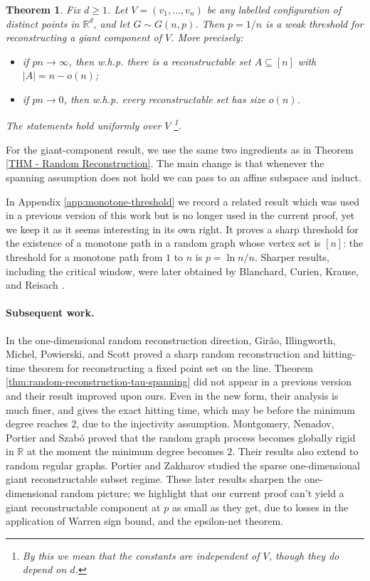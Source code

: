 \documentclass[fullpage,11pt]{article}
\theoremstyle{break}
\newtheorem{theorem}{Theorem}
\theoremstyle{definition}
\theoremstyle{break}
\begin{document}
\begin{theorem}\label{thm:weak-threshold-linear-reconstruction}
Fix \(d\ge1\). Let \(V=(v_1,\ldots,v_n)\) be any labelled configuration of
distinct points in \(\mathbb R^d\), and let \(G\sim G(n,p)\). Then \(p=1/n\)
is a weak threshold for reconstructing a giant component of \(V\). More
precisely:
\begin{itemize}
    \item if \(pn\to\infty\), then w.h.p. there is a reconstructable set
    \(A\subseteq[n]\) with \(|A|=n-o(n)\);
    \item if \(pn\to0\), then w.h.p. every reconstructable set has size
    \(o(n)\).
\end{itemize}
The statements hold uniformly over \(V\) \footnote{By this we mean that the constants are independent of $V$, though they do depend on $d$.}.
\end{theorem}

For the giant-component result, we use the same two ingredients as in
Theorem \ref{THM - Random Reconstruction}. The main change is that whenever the spanning assumption does not hold we can pass to an affine subspace and induct.

In Appendix \ref{app:monotone-threshold} we record a related result which was used in a previous version of this work but is no longer used in the current proof, yet we
keep it as it seems interesting in its own right. It proves a sharp threshold for the existence of a monotone path in a random graph whose vertex set is $[n]$: the threshold for a monotone path from \(1\) to \(n\) is \(p=\ln n/n\).
Sharper results, including the critical window, were later obtained by
Blanchard, Curien, Krause, and Reisach \cite{blanchard2025phase}.

\paragraph{Subsequent work.} In the one-dimensional random reconstruction direction, Girão, Illingworth, Michel, Powierski, and Scott \cite{FUWgirao2023reconstructing} proved a sharp random reconstruction and hitting-time theorem for reconstructing a fixed point set on the line. Theorem \ref{thm:random-reconstruction-tau-spanning} did not appear in a previous version and their result improved upon ours. Even in the new form, their analysis is much finer, and gives the exact hitting time, which may be before the minimum degree reaches $2$, due to the injectivity assumption. Montgomery, Nenadov, Portier and Szabó \cite{FUWmontgomery2024global} proved that the random graph process becomes globally rigid in \(\mathbb R\) at the moment the minimum degree becomes \(2\). Their results also extend to random regular graphs. Portier \cite{portier2026reconstructing} and Zakharov \cite{zakharov2026sharp} studied the sparse one-dimensional giant reconstructable subset regime. These later results sharpen the one-dimensional random picture; we highlight that our current proof can't yield a giant reconstructable component at $p$ as small as they get, due to losses in the application of Warren sign bound, and the epsilon-net theorem.
\end{document}
